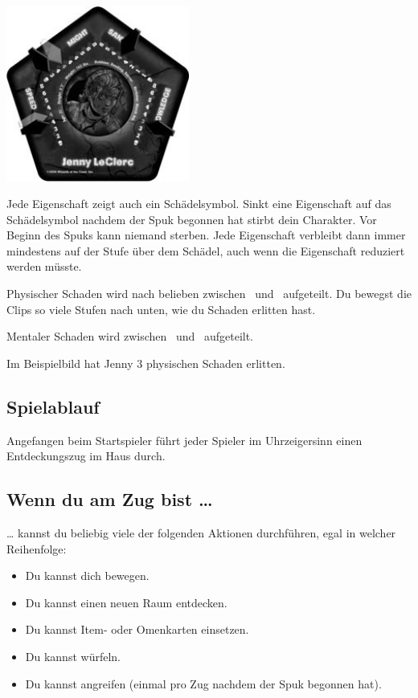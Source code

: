 \begin{center}
\includegraphics[width=6cm]{resources/traits}
\end{center}

Jede Eigenschaft zeigt auch ein Schädelsymbol. Sinkt eine Eigenschaft auf das Schädelsymbol nachdem der Spuk begonnen hat stirbt dein Charakter. Vor Beginn des Spuks kann niemand sterben. Jede Eigenschaft verbleibt dann immer mindestens auf der Stufe über dem Schädel, auch wenn die Eigenschaft reduziert werden müsste.

Physischer Schaden wird nach belieben zwischen \might\ und \speed\ aufgeteilt. Du bewegst die Clips so viele Stufen nach unten, wie du Schaden erlitten hast.

Mentaler Schaden wird zwischen \sanity\ und \know\ aufgeteilt.

Im Beispielbild hat Jenny 3 physischen Schaden erlitten.

\subsection{Spielablauf}

Angefangen beim Startspieler führt jeder Spieler im Uhrzeigersinn einen Entdeckungszug im Haus durch.

\subsection{Wenn du am Zug bist …}
… kannst du beliebig viele der folgenden Aktionen durchführen, egal in welcher Reihenfolge:

\begin{itemize}
    \item Du kannst dich bewegen.
    \item Du kannst einen neuen Raum entdecken.
    \item Du kannst Item- oder Omenkarten einsetzen.
    \item Du kannst würfeln.
    \item Du kannst angreifen (einmal pro Zug nachdem der Spuk begonnen hat).
\end{itemize}

